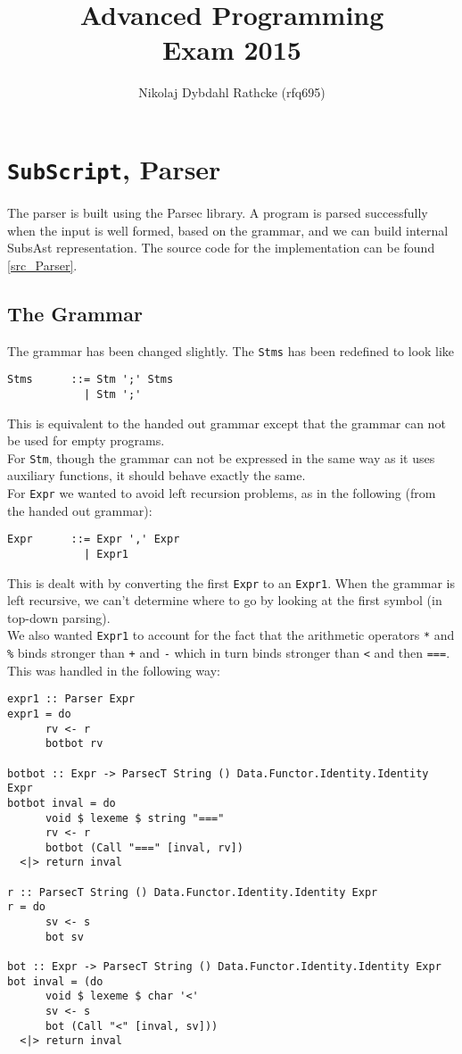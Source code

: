 \documentclass[a4paper]{article}
\author{Nikolaj Dybdahl Rathcke (rfq695)}
\title{Advanced Programming \\ Exam 2015}
\begin{document}
\maketitle

\section{\texttt{SubScript}, Parser}
The parser is built using the Parsec library. A program is parsed successfully when the input is well formed, based on the grammar, and we can build internal SubsAst representation. The source code for the implementation can be found \ref{src_Parser}.

\subsection{The Grammar}
The grammar has been changed slightly. The \texttt{Stms} has been redefined to look like
\begin{verbatim}
Stms      ::= Stm ';' Stms
            | Stm ';'
\end{verbatim}
This is equivalent to the handed out grammar except that the grammar can not be used for empty programs.\\
For \texttt{Stm}, though the grammar can not be expressed in the same way as it uses auxiliary functions, it should behave exactly the same. \\
For \texttt{Expr} we wanted to avoid left recursion problems, as in the following (from the handed out grammar):
\begin{verbatim}
Expr      ::= Expr ',' Expr
            | Expr1
\end{verbatim}
This is dealt with by converting the first \texttt{Expr} to an \texttt{Expr1}. When the grammar is left recursive, we can't determine where to go by looking at the first symbol (in top-down parsing). \\
We also wanted \texttt{Expr1} to account for the fact that the arithmetic operators \texttt{*} and \texttt{\%} binds stronger than \texttt{+} and \texttt{-} which in turn binds stronger than \texttt{<} and then \texttt{===}. This was handled in the following way: \\
\begin{lstlisting}
expr1 :: Parser Expr
expr1 = do
      rv <- r
      botbot rv

botbot :: Expr -> ParsecT String () Data.Functor.Identity.Identity Expr
botbot inval = do
      void $ lexeme $ string "==="
      rv <- r
      botbot (Call "===" [inval, rv])
  <|> return inval

r :: ParsecT String () Data.Functor.Identity.Identity Expr
r = do
      sv <- s
      bot sv

bot :: Expr -> ParsecT String () Data.Functor.Identity.Identity Expr
bot inval = (do
      void $ lexeme $ char '<'
      sv <- s
      bot (Call "<" [inval, sv]))
  <|> return inval
\end{lstlisting}
\end{document}
